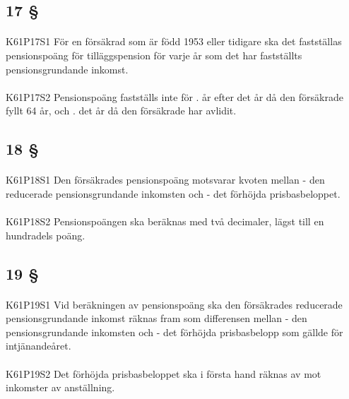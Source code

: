 \documentclass[a4paper,notitlepage,openany,10pt]{book}
\begin{document}
\subsection*{17 §}
\paragraph*{}
{\tiny K61P17S1}
För en försäkrad som är född 1953 eller tidigare ska det fastställas pensionspoäng för tilläggspension för varje år som det har fastställts pensionsgrundande inkomst.
\paragraph*{}
{\tiny K61P17S2}
Pensionspoäng fastställs inte för
. år efter det år då den försäkrade fyllt 64 år, och
. det år då den försäkrade har avlidit.
\subsection*{18 §}
\paragraph*{}
{\tiny K61P18S1}
Den försäkrades pensionspoäng motsvarar kvoten mellan
\newline - den reducerade pensionsgrundande inkomsten och
\newline - det förhöjda prisbasbeloppet.
\paragraph*{}
{\tiny K61P18S2}
Pensionspoängen ska beräknas med två decimaler, lägst till en hundradels poäng.
\subsection*{19 §}
\paragraph*{}
{\tiny K61P19S1}
Vid beräkningen av pensionspoäng ska den försäkrades reducerade pensionsgrundande inkomst räknas fram som differensen mellan
\newline - den pensionsgrundande inkomsten och
\newline - det förhöjda prisbasbelopp som gällde för intjänandeåret.
\paragraph*{}
{\tiny K61P19S2}
Det förhöjda prisbasbeloppet ska i första hand räknas av mot inkomster av anställning.
\end{document}
